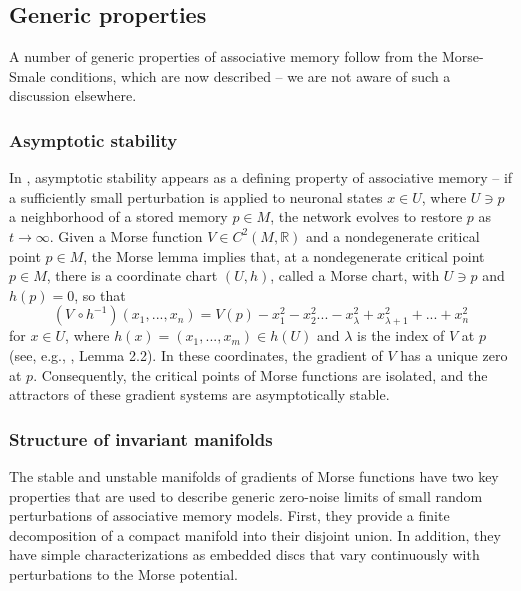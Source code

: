 \documentclass[12pt]{article}
\begin{document}
\subsection{Generic properties}
\label{subsection:structural-stability-models-associative-memory}
A number of generic properties of associative memory follow from the Morse-Smale conditions, which are now described -- we are not aware of such a discussion elsewhere. 

\subsubsection{Asymptotic stability}
\label{subsubsection:asymptotic-stability}
In \cite{hopfield1982neural}, asymptotic stability appears as a defining property of associative memory -- if a sufficiently small perturbation is applied to neuronal states $x \in U$, where $U \ni p$ a neighborhood of a stored memory $p \in M$, the network evolves to restore $p$ as $t\rightarrow \infty$. Given a Morse function $V \in C^2(M, \mathbb{R})$ and a nondegenerate critical point $p \in M$, the Morse lemma implies that, at a nondegenerate critical point $p \in M$, there is a coordinate chart $(U,h)$, called a Morse chart, with $U \ni p$ and $h(p)=0$, so that 
\begin{equation*}
    (V \, \circ h^{-1})(x_1,...,x_n) = V(p) - x_1^2 - x_2^2... - x_{\lambda}^2 + x_{\lambda+1}^2 + ... + x_n^2
\end{equation*}
for $x\in U$, where $h(x) = (x_1,...,x_m) \in h(U)$ and $\lambda$ is the index of $V$ at $p$ (see, e.g., \cite{milnor2016morse}, Lemma 2.2).
In these coordinates, the gradient of $V$ has a unique zero at $p$. Consequently, the critical points of Morse functions are isolated, and the attractors of these gradient systems are asymptotically stable.


\subsubsection{Structure of invariant manifolds} 
\label{subsubsection:structure-invariant-manifolds}
The stable and unstable manifolds of gradients of Morse functions have two key properties that are used to describe generic zero-noise limits of small random perturbations of associative memory models. First, they provide a finite decomposition of a compact manifold into their disjoint union. In addition, they have simple characterizations as embedded discs that vary continuously with perturbations to the Morse potential.
\end{document}
